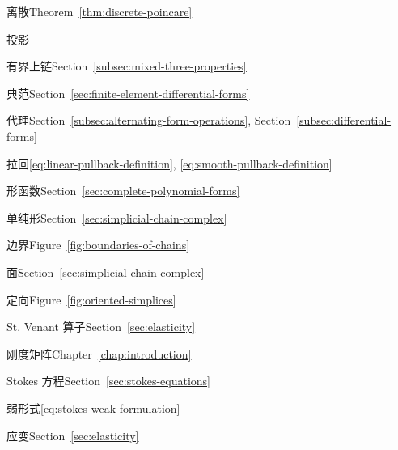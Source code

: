 \begin{theindex}
\subitem {}\label{index:poincar-inequality-discrete}{离散}\quad Theorem~\ref{thm:discrete-poincare}

\item {}\label{index:projection}{投影}

\subitem {}\label{index:projection-bounded-cochain}{有界上链}\quad Section~\ref{subsec:mixed-three-properties}

\subitem {}\label{index:projection-canonical}{典范}\quad Section~\ref{sec:finite-element-differential-forms}

\item {}\label{index:proxy}{代理}\quad Section~\ref{subsec:alternating-form-operations}, Section~\ref{subsec:differential-forms}

\item {}\label{index:pullback}{拉回}\quad \eqref{eq:linear-pullback-definition}, \eqref{eq:smooth-pullback-definition}

\item {}\label{index:shape-functions}{形函数}\quad Section~\ref{sec:complete-polynomial-forms}

\item {}\label{index:simplex}{单纯形}\quad Section~\ref{sec:simplicial-chain-complex}

\subitem {}\label{index:simplex-boundary-of}{边界}\quad Figure~\ref{fig:boundaries-of-chains}

\subitem {}\label{index:simplex-face}{面}\quad Section~\ref{sec:simplicial-chain-complex}

\subitem {}\label{index:simplex-orientation}{定向}\quad Figure~\ref{fig:oriented-simplices}

\item {}\label{index:st-venant-operator}{St. Venant 算子}\quad Section~\ref{sec:elasticity}

\item {}\label{index:stiffness-matrix}{刚度矩阵}\quad Chapter~\ref{chap:introduction}

\item {}\label{index:stokes-equations}{Stokes 方程}\quad Section~\ref{sec:stokes-equations}

\subitem {}\label{index:stokes-equations-weak-formulation}{弱形式}\quad \eqref{eq:stokes-weak-formulation}

\item {}\label{index:strain}{应变}\quad Section~\ref{sec:elasticity}


\end{theindex}

